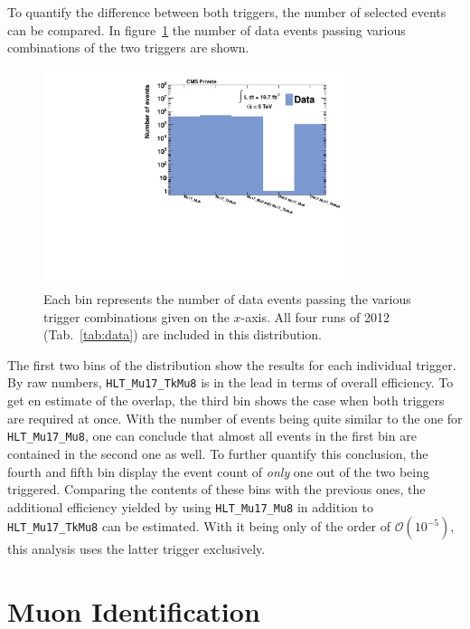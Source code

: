 To quantify the difference between both triggers, the number of selected events can be compared. In figure~\ref{fig:matched} the number of data events passing various combinations of the two triggers are shown.

\begin{figure}[ht!]
  \centering
    \includegraphics[width=0.8\textwidth]{plots/dycut_matched.pdf}
  \caption{Each bin represents the number of data events passing the various trigger combinations given on the $x$-axis. All four runs of 2012 (Tab.~\ref{tab:data}) are included in this distribution.}
  \label{fig:matched}
\end{figure}

\noindent The first two bins of the distribution show the results for each individual trigger. By raw numbers, \verb+HLT_Mu17_TkMu8+ is in the lead in terms of overall efficiency. To get en estimate of the overlap, the third bin shows the case when both triggers are required at once. With the number of events being quite similar to the one for \verb+HLT_Mu17_Mu8+, one can conclude that almost all events in the first bin are contained in the second one as well. To further quantify this conclusion, the fourth and fifth bin display the event count of \textit{only} one out of the two being triggered. Comparing the contents of these bins with the previous ones, the additional efficiency yielded by using \verb+HLT_Mu17_Mu8+ in addition to \verb+HLT_Mu17_TkMu8+ can be estimated. With it being only of the order of $\mathcal{O}(10^{-5})$, this analysis uses the latter trigger exclusively.


\section{Muon Identification}
\label{sec:muonid}

